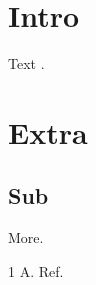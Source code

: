 \documentclass{article}
\begin{document}
\section{Intro} Text \cite{a}.
\appendix
\section{Extra}
\subsection{Sub} More.
\begin{thebibliography}{1} A. Ref.\end{thebibliography}
\end{document}
